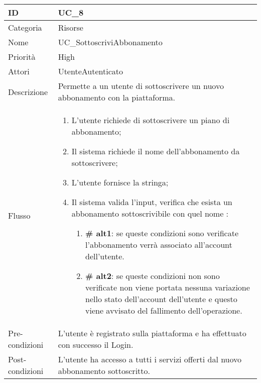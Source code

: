 \begin{center}
\begin{tabular}{ |p{2cm}|p{13cm}|  }
\hline
ID & UC\_8 \\\hline
Categoria & Risorse\\\hline
Nome & UC\_SottoscriviAbbonamento\\\hline
Priorità & High \\\hline
Attori &  UtenteAutenticato \\\hline
Descrizione & Permette a un utente di sottoscrivere un nuovo abbonamento con la piattaforma.\\\hline
Flusso &  	\begin{enumerate}
			\item L'utente richiede di sottoscrivere un piano di abbonamento;
			\item Il sistema richiede il nome dell'abbonamento da sottoscrivere;
			\item L'utente fornisce la stringa;
			\item Il sistema valida l'input, verifica che esista un abbonamento sottoscrivibile con quel nome :
			\begin{enumerate}[  ]
				\item \textbf{\# alt1}: se queste condizioni sono verificate l'abbonamento verrà associato all'account dell'utente.
				\item \textbf{\# alt2}: se queste condizioni non sono verificate non viene portata nessuna variazione nello stato dell'account dell'utente e questo viene avvisato del fallimento dell'operazione.
			\end{enumerate}
		\end{enumerate}\\\hline
Pre-condizioni & L'utente è registrato sulla piattaforma e ha effettuato con successo il Login.\\\hline
Post-condizioni &  L'utente ha accesso a tutti i servizi offerti dal nuovo abbonamento sottoscritto.\\\hline
\end{tabular}
\label{table_use_case:8}\newline


\end{center}
